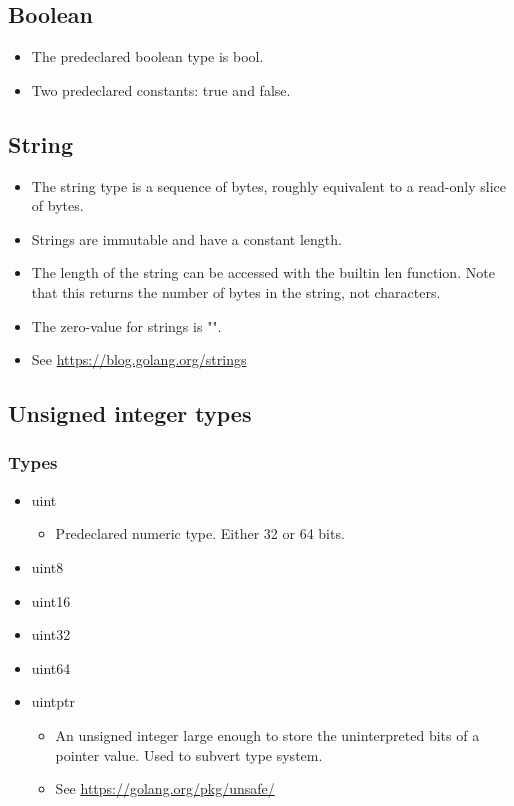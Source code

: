 \documentclass{article}
\begin{document}
	\subsection{Boolean}
		\begin{itemize}
			\item The predeclared boolean type is \colorbox{code}{bool}.
			\item Two predeclared constants: \colorbox{code}{true} and \colorbox{code}{false}.
		\end{itemize}
			
	\subsection{String}
		\begin{itemize}
			\item The \colorbox{code}{string} type is a sequence of bytes, roughly equivalent to a read-only slice of bytes. 
			\item Strings are immutable and have a constant length. 
			\item The length of the string can be accessed with the builtin \colorbox{code}{len} function. Note that this returns the number of bytes in the string, not characters. 
			\item The zero-value for strings is \colorbox{code}{""}.
			\item See \url{https://blog.golang.org/strings}
		\end{itemize} 
	
	\subsection{Unsigned integer types}	
		\subsubsection{Types}
		\begin{itemize}
    			\item uint
				\begin{itemize}
					\item Predeclared numeric type. Either 32 or 64 bits. 
				\end{itemize}
    			\item uint8
   	 		\item uint16
    			\item uint32
    			\item uint64
    			\item uintptr
				\begin{itemize}
					\item An unsigned integer large enough to store the uninterpreted bits of a pointer value. Used to subvert type system. 
					\item See \url{https://golang.org/pkg/unsafe/}
				\end{itemize}
		\end{itemize}
\end{document}
